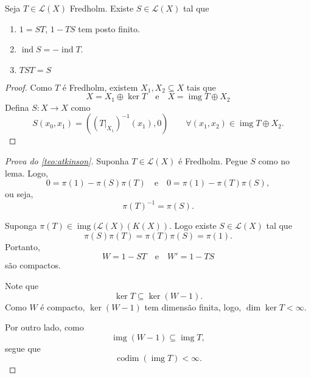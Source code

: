 \documentclass[portuguese]{article}
\theoremstyle{definition}
\DeclareMathOperator{\img}{img}
\begin{document}
\begin{lema}
	Seja $T\in\mathcal{L}(X)$ Fredholm. Existe $S\in\mathcal{L}(X)$ tal que
	\begin{enumerate}
		\item $1=ST$, $1-TS$ tem posto finito.
		\item $\operatorname{ind}S=-\operatorname{ind}T$.
		\item $TST=S$
	\end{enumerate}
\end{lema}
\begin{proof}
	Como $T$ é Fredholm, existem $X_1,X_2\subseteq X$ tais que
	\[X=X_1\oplus \ker T\quad\text{e}\quad X=\img T\oplus X_2\]
	Defina $S:X\to X$ como
	\[S(x_0,x_1)=((T|_{X_1})^{-1}(x_1),0)\qquad\forall (x_1,x_2)\in\img T\oplus X_2.\]
\end{proof}
\begin{proof}[Prova do \cref{teo:atkinson}]
	Suponha $T\in\mathcal{L}(X)$ é Fredholm. Pegue $S$ como no lema. Logo,
	\[0=\pi(1)-\pi(S)\pi(T)\quad\text{e}\quad0=\pi(1)-\pi(T)\pi(S),\]
	ou seja,
	\[\pi(T)^{-1}=\pi(S).\]
	
	Suponga $\pi(T)\in\img(\mathcal{L}(X)(K(X))$. Logo existe $S\in\mathcal{L}(X)$ tal que
	\[\pi(S)\pi(T)=\pi(T)\pi(S)=\pi(1).\]
	Portanto,
	\[W=1-ST\quad\text{e}\quad W'=1-TS\]
	são compactos.
	
	Note que
	\[\ker T\subseteq \ker(W-1).\]
	Como $W$ é compacto, $\ker(W-1)$ tem dimensão finita, logo, $\dim\ker T<\infty$.
	
	Por outro lado, como
	\[\img(W-1)\subseteq\img T,\]
	segue que
	\[\operatorname{codim}(\img T)<\infty.\]
\end{proof}
\end{document}
